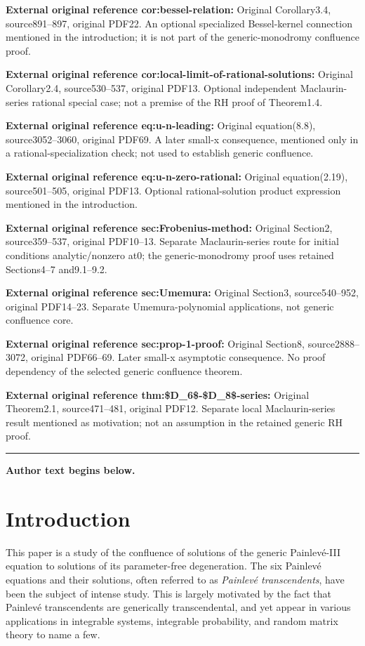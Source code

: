 \documentclass[11pt]{article}
\numberwithin{equation}{section}
\numberwithin{equation}{section}
\begin{document}
\noindent\textbf{External original reference cor:bessel-relation:} Original Corollary3.4, source891–897, original PDF22. An optional specialized Bessel-kernel connection mentioned in the introduction; it is not part of the generic-monodromy confluence proof.\par
\noindent\textbf{External original reference cor:local-limit-of-rational-solutions:} Original Corollary2.4, source530–537, original PDF13. Optional independent Maclaurin-series rational special case; not a premise of the RH proof of Theorem1.4.\par
\noindent\textbf{External original reference eq:u-n-leading:} Original equation(8.8), source3052–3060, original PDF69. A later small-x consequence, mentioned only in a rational-specialization check; not used to establish generic confluence.\par
\noindent\textbf{External original reference eq:u-n-zero-rational:} Original equation(2.19), source501–505, original PDF13. Optional rational-solution product expression mentioned in the introduction.\par
\noindent\textbf{External original reference sec:Frobenius-method:} Original Section2, source359–537, original PDF10–13. Separate Maclaurin-series route for initial conditions analytic/nonzero at0; the generic-monodromy proof uses retained Sections4–7 and9.1–9.2.\par
\noindent\textbf{External original reference sec:Umemura:} Original Section3, source540–952, original PDF14–23. Separate Umemura-polynomial applications, not generic confluence core.\par
\noindent\textbf{External original reference sec:prop-1-proof:} Original Section8, source2888–3072, original PDF66–69. Later small-x asymptotic consequence. No proof dependency of the selected generic confluence theorem.\par
\noindent\textbf{External original reference thm:\$D\_6\$-\$D\_8\$-series:} Original Theorem2.1, source471–481, original PDF12. Separate local Maclaurin-series result mentioned as motivation; not an assumption in the retained generic RH proof.\par
\medskip\hrule\medskip\noindent\textbf{Author text begins below.}\par

\section{Introduction}
This paper is a study of the confluence of solutions of the generic Painlev\'e-III equation to solutions of its parameter-free degeneration. The six Painlev\'e equations and their solutions, often referred to as \emph{Painlev\'e transcendents}, have been the subject of intense study. This is largely motivated by the fact that Painlev\'e transcendents are generically transcendental, and yet appear in various applications in integrable systems, integrable probability, and random matrix theory to name a few.
\end{document}
